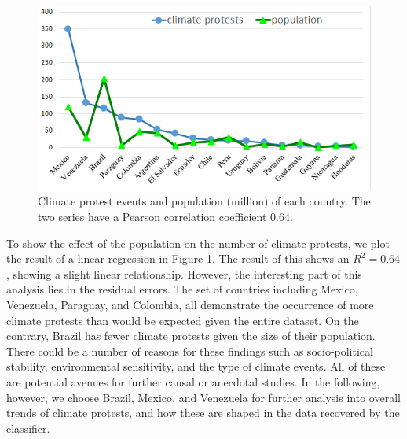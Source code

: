 \documentclass[9pt,twocolumn,twoside]{pnas-new}
\begin{document}
\begin{figure}[ht]
\centerline
{\includegraphics[width=.4\textwidth]{figures/protest-population}}
\caption{Climate protest events and population (million) of each country. The two series have a Pearson correlation coefficient 0.64.}
\label{protest-population}
\end{figure}

To show the effect of the population on the number of climate protests, we plot the result of a linear regression in Figure \ref{protest-population}.
The result of this shows an $R^2 = 0.64$, showing a slight linear relationship.
However, the interesting part of this analysis lies in the residual errors.
The set of countries including Mexico, Venezuela, Paraguay, and Colombia, all demonstrate the occurrence of more climate protests than would be expected given the entire dataset.
On the contrary, Brazil has fewer climate protests given the size of their population.
There could be a number of reasons for these findings such as socio-political stability, environmental sensitivity, and the type of climate events.
All of these are potential avenues for further causal or anecdotal studies.
In the following, however, we choose Brazil, Mexico, and Venezuela for further analysis into overall trends of climate protests, and how these are shaped in the data recovered by the classifier.

\end{document}
